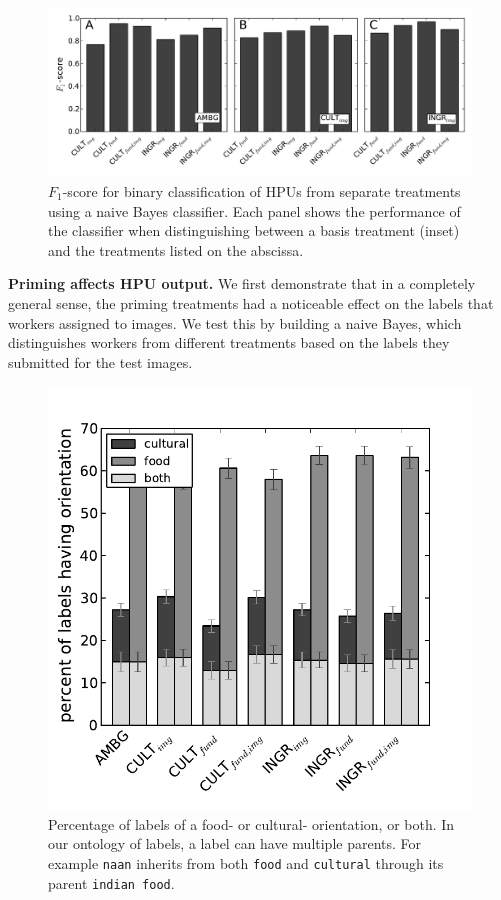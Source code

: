 \documentclass[letterpaper]{article}
\begin{document}
\begin{figure}
	\begin{center}
		\includegraphics[scale=0.55]{../figs/f1scores.pdf}
		\caption{$F_1$-score for binary classification of HPUs from separate
			treatments using a naive Bayes classifier.  Each panel shows
			the performance of the classifier when distinguishing between 
			a basis treatment (inset) and the treatments listed on the 
			abscissa.
		}
		\label{fig:classifier}
	\end{center}
\end{figure}

\textbf{Priming affects HPU output.}
We first demonstrate that in a completely general sense, the priming treatments
had a noticeable effect on the labels that workers assigned to images.  We
test this by building a naive Bayes, which distinguishes workers from 
different treatments based on the labels they submitted for the test images.

\begin{figure}
	\includegraphics[scale=0.65]{../figs/valenceComparison.pdf}
	\caption{Percentage of labels of a food- or cultural- orientation, or
	both.  In our ontology of labels, a label can have multiple parents. 
	For example \texttt{naan} inherits from both \texttt{food} and 
	\texttt{cultural} through its parent \texttt{indian food}.}
	\label{fig:valence}
\end{figure}
\end{document}
